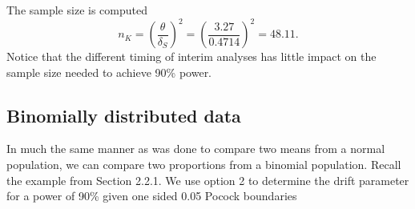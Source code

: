The sample size is computed
\begin{displaymath}
  n_K = \left( \frac{\theta}{\delta_S} \right)^2 = 
        \left( \frac{3.27}{0.4714} \right)^2  = 48.11.
\end{displaymath}
Notice that the different timing of interim analyses has little impact on
the sample size needed to achieve 90\% power.


\subsection{Binomially distributed data}

In much the same manner as was done to compare two means from a normal
population, we can compare two proportions from a binomial population.
Recall the example from Section 2.2.1.  We use option 2 to determine the
drift parameter for a power of 90\% given one sided 0.05 Pocock boundaries
